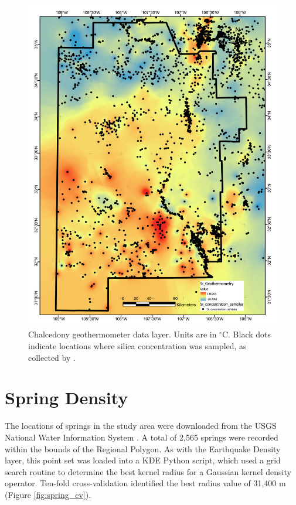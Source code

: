 \begin{figure}[H]
\centering
\includegraphics[width=0.75\linewidth]{templates/images/Figure-SiTemp.pdf}
\caption[Silica geothermometer temperature data layer]{Chalcedony geothermometer data layer. Units are in $^\circ$C. Black dots indicate locations where silica concentration was sampled, as collected by \protect\citet{bielicki_hydrogeolgic_2015}.}
\label{fig:feat_si_temp}
\end{figure}
\pagebreak

\section{Spring Density}\label{app:dl_spring_density}
The locations of springs in the study area were downloaded from the USGS National Water Information System \citep{usgs_national_2021}. A total of 2,565 springs were recorded within the bounds of the Regional Polygon. As with the Earthquake Density layer, this point set was loaded into a KDE Python script, which used a grid search routine to determine the best kernel radius for a Gaussian kernel density operator. Ten-fold cross-validation identified the best radius value of 31,400 m (Figure \ref{fig:spring_cv}). 

